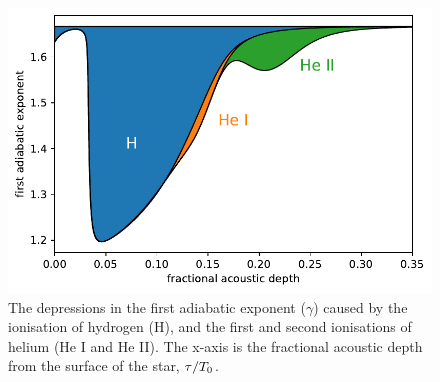 \begin{figure}
    \centering
    \includegraphics{figures/adiabatic-ionisation-regions.pdf}
    \caption{The depressions in the first adiabatic exponent (\(\gamma\)) caused by the ionisation of hydrogen (H), and the first and second ionisations of helium (He I and He II). The x-axis is the fractional acoustic depth from the surface of the star, \(\tau/{T_0}\).}
    \label{fig:gamma-zones}
\end{figure}

